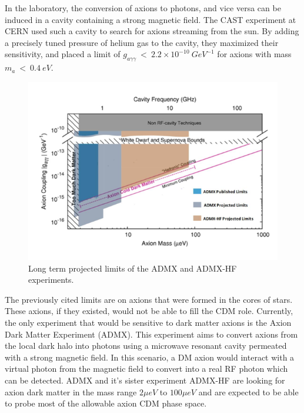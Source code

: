 In the laboratory, the conversion of axions to photons, and vice versa can be induced in a cavity containing a strong magnetic field. The CAST experiment at CERN used such a cavity to search for axions streaming from the sun. By adding a precisely tuned pressure of helium gas to the cavity, they maximized their sensitivity, and placed a limit of $g_{a \gamma \gamma} \ < \ 2.2 \times 10^{-10} \ GeV^{-1}$ for axions with mass $m_{a} \ < \ 0.4 \ eV$\cite{axion_DM,axion_photon}.
\begin{figure}[h!]
\centering
\includegraphics[width=150mm]{Figures/ADMX.png}
\caption{Long term projected limits of the ADMX and ADMX-HF experiments. \cite{ADMX}}
\label{fig:admx} 
\end{figure}

The previously cited limits are on axions that were formed in the cores of stars. These axions, if they existed, would not be able to fill the CDM role. Currently, the only experiment that would be sensitive to dark matter axions is the Axion Dark Matter Experiment (ADMX). This experiment aims to convert axions from the local dark halo into photons using a microwave resonant cavity permeated with a strong magnetic field. In this scenario, a DM axion would interact with a virtual photon from the magnetic field to convert into a real RF photon which can be detected. ADMX and it's sister experiment ADMX-HF are looking for axion dark matter in the mass range $2 \mu eV$ to $100 \mu eV$ and are expected to be able to probe most of the allowable axion CDM phase space\cite{axion_DM,ADMX}.






